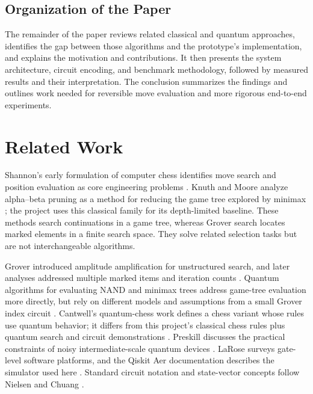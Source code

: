 \documentclass[conference]{IEEEtran}
\begin{document}
\subsection{Organization of the Paper}
The remainder of the paper reviews related classical and quantum approaches, identifies the gap between those algorithms and the prototype's implementation, and explains the motivation and contributions. It then presents the system architecture, circuit encoding, and benchmark methodology, followed by measured results and their interpretation. The conclusion summarizes the findings and outlines work needed for reversible move evaluation and more rigorous end-to-end experiments.

\section{Related Work}
Shannon's early formulation of computer chess identifies move search and position evaluation as core engineering problems \cite{shannon1950}. Knuth and Moore analyze alpha--beta pruning as a method for reducing the game tree explored by minimax \cite{knuth1975}; the project uses this classical family for its depth-limited baseline. These methods search continuations in a game tree, whereas Grover search locates marked elements in a finite search space. They solve related selection tasks but are not interchangeable algorithms.

Grover introduced amplitude amplification for unstructured search, and later analyses addressed multiple marked items and iteration counts \cite{grover1996,boyer1998,brassard2002}. Quantum algorithms for evaluating NAND and minimax trees address game-tree evaluation more directly, but rely on different models and assumptions from a small Grover index circuit \cite{farhi2008,cleve2008}. Cantwell's quantum-chess work defines a chess variant whose rules use quantum behavior; it differs from this project's classical chess rules plus quantum search and circuit demonstrations \cite{cantwell2019}. Preskill discusses the practical constraints of noisy intermediate-scale quantum devices \cite{preskill2018}. LaRose surveys gate-level software platforms, and the Qiskit Aer documentation describes the simulator used here \cite{larose2019,aer2026}. Standard circuit notation and state-vector concepts follow Nielsen and Chuang \cite{nielsen2010}.
\end{document}
